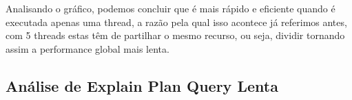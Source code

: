 \documentclass{article}
\begin{document}
Analisando o gráfico, podemos concluir que é mais rápido e eficiente quando é executada apenas uma thread, a razão pela qual isso acontece já referimos antes, com 5 threads estas têm de partilhar o mesmo recurso, ou seja, dividir tornando assim a performance global mais lenta.


\clearpage
\subsection{Análise de Explain Plan Query Lenta}
\clearpage
\end{document}
